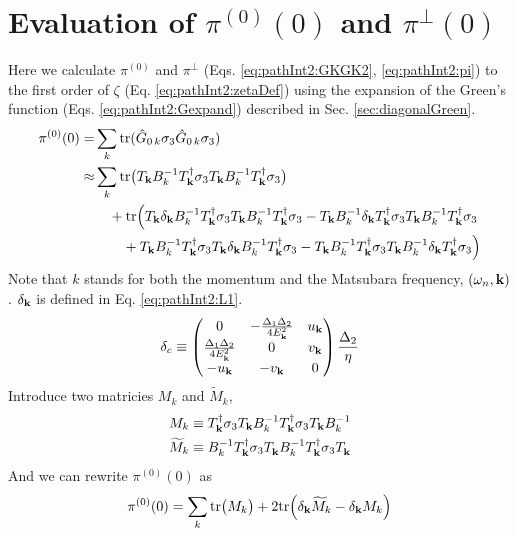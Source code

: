 \section{Evaluation of $\pi^{(0)}(0)$ and $\pi^{\perp}(0)$\label{sec:calculatePi}}
Here we  calculate $\pi^{(0)}$ and $\pi^{\perp}$ (Eqs. \ref{eq:pathInt2:GKGK2}, \ref{eq:pathInt2:pi}) to the first order of $\zeta$ (Eq. \ref{eq:pathInt2:zetaDef}) using the expansion of the Green's function (Eqs. \ref{eq:pathInt2:Gexpand}) described in Sec. \ref{sec:diagonalGreen}.
\begin{equation}\label{eq:pathInt2:pi0long}
\begin{split}
\pi^{(0)}(0)=&\sum_k\text{tr}(\hat{G}_{0\,k}\sigma_3\hat{G}_{0\,k}\sigma_3)\\
	\approx&\sum_k\text{tr}\big(T_{\mathbf{k}}B_{k}^{-1}T_{\mathbf{k}}^{\dagger}\sigma_3T_{\mathbf{k}}B_{k}^{-1}T_{\mathbf{k}}^{\dagger}\sigma_3\big)\\
	&\quad+\text{tr}\Big(T_{\mathbf{k}}\delta_{\mathbf{k}}B_{k}^{-1}T_{\mathbf{k}}^{\dagger}\sigma_3T_{\mathbf{k}}B_{k}^{-1}T_{\mathbf{k}}^{\dagger}\sigma_3
	-T_{\mathbf{k}}B_{k}^{-1}\delta_{\mathbf{k}}T_{\mathbf{k}}^{\dagger}\sigma_3T_{\mathbf{k}}B_{k}^{-1}T_{\mathbf{k}}^{\dagger}\sigma_3\\
	&\qquad+T_{\mathbf{k}}B_{k}^{-1}T_{\mathbf{k}}^{\dagger}\sigma_3T_{\mathbf{k}}\delta_{\mathbf{k}}B_{k}^{-1}T_{\mathbf{k}}^{\dagger}\sigma_3
	-T_{\mathbf{k}}B_{k}^{-1}T_{\mathbf{k}}^{\dagger}\sigma_3T_{\mathbf{k}}B_{k}^{-1}\delta_{\mathbf{k}}T_{\mathbf{k}}^{\dagger}\sigma_3\Big)
	\end{split}
\end{equation}
Note that $k$ stands for both the momentum and  the Matsubara frequency, $(\omega_{n},\mathbf{k})$. $\delta_{\mathbf{k}}$ is defined in Eq. \ref{eq:pathInt2:L1}. 
\begin{equation*}
\delta_{c}\equiv\begin{pmatrix}0&-\frac{\Delta_{1}{}\Delta_{2}{}}{4E^{2}_{\mathbf{k}}}&u_{\mathbf{k}}\\
\frac{\Delta_{1}{}\Delta_{2}{}}{4E^{2}_{\mathbf{k}}}&0&v_{\mathbf{k}}\\
-u_{\mathbf{k}}&-v_{\mathbf{k}}&0
\end{pmatrix}\frac{\Delta_{2}{}}{\eta}
\end{equation*}
Introduce two matricies $M_{k}$ and $\widetilde{M}_{k}$, 
\begin{gather}
M_{k}\equiv{}T_{\mathbf{k}}^{\dagger}\sigma_3T_{\mathbf{k}}B_{k}^{-1}T_{\mathbf{k}}^{\dagger}\sigma_3T_{\mathbf{k}}B_{k}^{-1}\\
\widetilde{M}_{k}\equiv{}B_{k}^{-1}T_{\mathbf{k}}^{\dagger}\sigma_3T^{}_{\mathbf{k}}B_{k}^{-1}T_{\mathbf{k}}^{\dagger}\sigma_3T^{}_{\mathbf{k}}
\end{gather}
And we can rewrite $\pi^{(0)}(0)$ as
\begin{equation}
\pi^{(0)}(0)=\sum_k\text{tr}\big({M}_{k}\big)+2\text{tr}\Big(\delta_{\mathbf{k}}\widetilde{M}_{k}-\delta_{\mathbf{k}}M_{k}\Big)
\end{equation}

